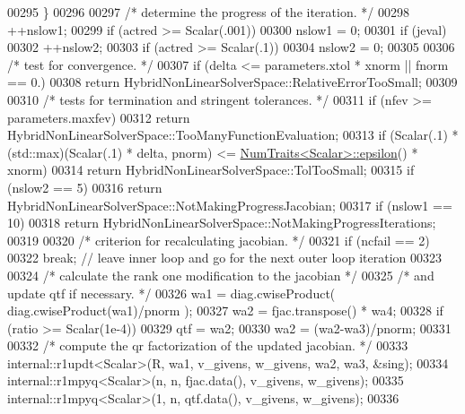 \begin{DoxyCode}
00295         \}
00296 
00297         \textcolor{comment}{/* determine the progress of the iteration. */}
00298         ++nslow1;
00299         \textcolor{keywordflow}{if} (actred >= Scalar(.001))
00300             nslow1 = 0;
00301         \textcolor{keywordflow}{if} (jeval)
00302             ++nslow2;
00303         \textcolor{keywordflow}{if} (actred >= Scalar(.1))
00304             nslow2 = 0;
00305 
00306         \textcolor{comment}{/* test for convergence. */}
00307         \textcolor{keywordflow}{if} (delta <= parameters.xtol * xnorm || fnorm == 0.)
00308             \textcolor{keywordflow}{return} HybridNonLinearSolverSpace::RelativeErrorTooSmall;
00309 
00310         \textcolor{comment}{/* tests for termination and stringent tolerances. */}
00311         \textcolor{keywordflow}{if} (nfev >= parameters.maxfev)
00312             \textcolor{keywordflow}{return} HybridNonLinearSolverSpace::TooManyFunctionEvaluation;
00313         \textcolor{keywordflow}{if} (Scalar(.1) * (std::max)(Scalar(.1) * delta, pnorm) <= 
      \hyperlink{group___core___module_struct_eigen_1_1_num_traits}{NumTraits<Scalar>::epsilon}() * xnorm)
00314             \textcolor{keywordflow}{return} HybridNonLinearSolverSpace::TolTooSmall;
00315         \textcolor{keywordflow}{if} (nslow2 == 5)
00316             \textcolor{keywordflow}{return} HybridNonLinearSolverSpace::NotMakingProgressJacobian;
00317         \textcolor{keywordflow}{if} (nslow1 == 10)
00318             \textcolor{keywordflow}{return} HybridNonLinearSolverSpace::NotMakingProgressIterations;
00319 
00320         \textcolor{comment}{/* criterion for recalculating jacobian. */}
00321         \textcolor{keywordflow}{if} (ncfail == 2)
00322             \textcolor{keywordflow}{break}; \textcolor{comment}{// leave inner loop and go for the next outer loop iteration}
00323 
00324         \textcolor{comment}{/* calculate the rank one modification to the jacobian */}
00325         \textcolor{comment}{/* and update qtf if necessary. */}
00326         wa1 = diag.cwiseProduct( diag.cwiseProduct(wa1)/pnorm );
00327         wa2 = fjac.transpose() * wa4;
00328         \textcolor{keywordflow}{if} (ratio >= Scalar(1e-4))
00329             qtf = wa2;
00330         wa2 = (wa2-wa3)/pnorm;
00331 
00332         \textcolor{comment}{/* compute the qr factorization of the updated jacobian. */}
00333         internal::r1updt<Scalar>(R, wa1, v\_givens, w\_givens, wa2, wa3, &sing);
00334         internal::r1mpyq<Scalar>(n, n, fjac.data(), v\_givens, w\_givens);
00335         internal::r1mpyq<Scalar>(1, n, qtf.data(), v\_givens, w\_givens);
00336 

\end{DoxyCode}
